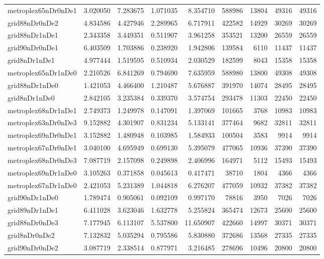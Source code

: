 \begin{longtable}{|l|r|r|r|r|r|r|r|r|}
metroplex65nDr0nDe1 & 3.020050 & 7.283675 & 1.071035 & 8.354710 & 588986 & 13804 & 49316 & 49316 \\
grid88nDr0nDe2 & 4.834586 & 4.427946 & 2.289965 & 6.717911 & 422582 & 14929 & 30269 & 30269 \\
grid88nDr1nDe1 & 2.343358 & 3.449351 & 0.511907 & 3.961258 & 353521 & 13200 & 26559 & 26559 \\
grid90nDr0nDe1 & 6.403509 & 1.703886 & 0.238920 & 1.942806 & 139584 & 6110 & 11437 & 11437 \\
grid8nDr1nDe1 & 4.977444 & 1.519595 & 0.510934 & 2.030529 & 182599 & 8043 & 15358 & 15358 \\
metroplex65nDr1nDe0 & 2.210526 & 6.841269 & 0.794690 & 7.635959 & 588980 & 13800 & 49308 & 49308 \\
grid88nDr1nDe0 & 1.421053 & 4.466400 & 1.210487 & 5.676887 & 391970 & 14074 & 28495 & 28495 \\
grid8nDr1nDe0 & 2.842105 & 3.235384 & 0.339370 & 3.574754 & 293478 & 11303 & 22450 & 22450 \\
metroplex68nDr1nDe1 & 2.749373 & 1.249978 & 0.147091 & 1.397069 & 101665 & 3768 & 10983 & 10983 \\
metroplex63nDr0nDe3 & 9.152882 & 4.301907 & 0.831234 & 5.133141 & 377464 & 9682 & 32811 & 32811 \\
metroplex69nDr0nDe1 & 3.152882 & 1.480948 & 0.103985 & 1.584933 & 100504 & 3583 & 9914 & 9914 \\
metroplex67nDr0nDe1 & 3.040100 & 4.695949 & 0.699130 & 5.395079 & 477065 & 10936 & 37390 & 37390 \\
metroplex68nDr0nDe3 & 7.087719 & 2.157098 & 0.249898 & 2.406996 & 164971 & 5112 & 15493 & 15493 \\
metroplex69nDr1nDe0 & 3.105263 & 0.371858 & 0.045613 & 0.417471 & 38710 & 1804 & 4366 & 4366 \\
metroplex67nDr1nDe0 & 2.421053 & 5.231389 & 1.044818 & 6.276207 & 477059 & 10932 & 37382 & 37382 \\
grid90nDr1nDe0 & 1.789474 & 0.905061 & 0.092109 & 0.997170 & 78816 & 3950 & 7026 & 7026 \\
grid89nDr1nDe1 & 6.411028 & 3.623046 & 1.632778 & 5.255824 & 365474 & 12673 & 25600 & 25600 \\
grid88nDr0nDe3 & 7.177945 & 6.113107 & 5.537800 & 11.650907 & 422660 & 14997 & 30371 & 30371 \\
grid8nDr0nDe2 & 7.132832 & 5.035294 & 0.795586 & 5.830880 & 372686 & 13568 & 27335 & 27335 \\
grid90nDr0nDe2 & 3.087719 & 2.338514 & 0.877971 & 3.216485 & 278696 & 10496 & 20800 & 20800 \\

\end{longtable}
